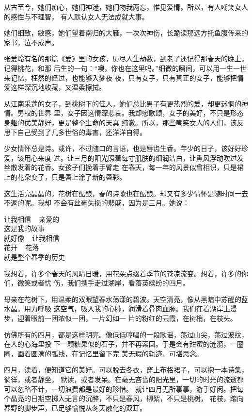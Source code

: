 		从古至今，她们痴心，她们神迷，她们物我两忘，惟见爱情。所以，有人嘲笑女人的感性与不理智，
	有人默认女人无法成就大事。

		她们细致，敏感，她们望着南归的大雁，一次次神伤，长跪读那远方托鱼腹传来的家书，泣不成声。

		张爱玲有名的那篇《爱》里的女孩，历尽人生劫数，到老了还记得那春天的晚上，记得桃花，和那
	后生的一句：“噢，你也在这里吗。”细微的瞬间，可以用一生一世来记忆，枉然的经过，也能够入梦夜
	夜，只有女子，只有真正的女子，能够把情爱这样深沉地收藏，又温柔擦拭。


		从江南采莲的女子，到桃树下的佳人，她们总比男子有更热烈的爱，却更迷惘的神情。男权的世界
	里，女子因这情深悲哀。我却愿歌颂，女子的美好，不只是形态身躯的优美静好，更是整个生命的天真
	纯澈。所以，那些嘲笑女人的人们，该反思下自己受到了几多世俗的毒害，还洋洋自得。


		少女情怀总是诗。或许，不过随口的言语，也是唇齿生香。年少的日子，该好好珍爱，该用心来度
	过。让三月的阳光照着每寸肌肤的细润洁白，让熏风浮动吹过发丝散发着的花香。女孩子们挽着手臂走
	在春天，每一年的风景似曾相识，只是裙上的花朵变了，只是唇上涂了新的唇彩。


		这生活亮晶晶的，花树在酝酿，春的诗歌也在酝酿。却又有多少情怀是随时间一去不返的呢。我却
	不会有丝毫失损的悲戚，因为是三月。她说：

		\longpoem{}{}{}
			让我相信 ~ 亲爱的 \\
			这是我的故事 \\
			就好像 ~ 让我相信 \\
			花开 ~ 花落 \\
			就是整个春季的历史
		\endlongpoem

	\endwriting



		我想着，许多个春天的风晴日暖，用花朵点缀着季节的苍凉流变。想着，许多的你们，微笑或者忧
	伤，我们携手走过湖岸，看落英缤纷的四月。

		母亲在花树下，用温柔的双眼望春水荡漾的碧波。天空清亮，像从黑暗中苏醒的蓝水晶。用力呼吸
	这空气，吸入我的心肺，润滑着骨肉血脉。我们在着湖岸上漫步，迎着眼前一团浓似一团，一片幻如一
	片的粉红的云霞，在树梢，在枝头。

		仿佛所有的四月，都是这样明亮。像低低哼唱的一段歌谣，荡过山尖，荡过波纹，在人的心海里投
	下一颗糖果似的石子，并不再索回。于是会有甜蜜的涟漪，一圈圈，画着圆满的弧线，在记忆里留下完
	美无瑕的轨迹，可堪思念。

		四月，读着，便知道它的美好。可以脱去冬衣，穿上布格裙子，可以抱一本诗集，徜徉，或者静坐，
	默读，或者发呆。在毫无吝啬的阳光里，一切的时光的流逝都可以忽略不计，一切浪费都是最好的珍惜。
	就让四月无所事事，游手好闲。把每个晶亮的日期空掷入无言的沉醉，不只是春风，柳絮，不只是桃树，
	花枝，踏向春野的脚步声，已足够愉悦从冬天融化的双耳。

